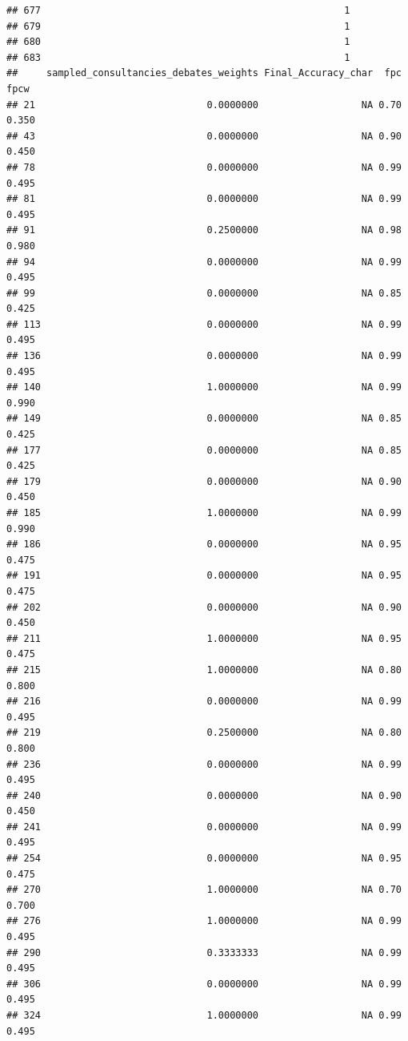 \documentclass[
]{article}
\begin{document}
\begin{verbatim}
## 677                                                     1
## 679                                                     1
## 680                                                     1
## 683                                                     1
##     sampled_consultancies_debates_weights Final_Accuracy_char  fpc  fpcw
## 21                              0.0000000                  NA 0.70 0.350
## 43                              0.0000000                  NA 0.90 0.450
## 78                              0.0000000                  NA 0.99 0.495
## 81                              0.0000000                  NA 0.99 0.495
## 91                              0.2500000                  NA 0.98 0.980
## 94                              0.0000000                  NA 0.99 0.495
## 99                              0.0000000                  NA 0.85 0.425
## 113                             0.0000000                  NA 0.99 0.495
## 136                             0.0000000                  NA 0.99 0.495
## 140                             1.0000000                  NA 0.99 0.990
## 149                             0.0000000                  NA 0.85 0.425
## 177                             0.0000000                  NA 0.85 0.425
## 179                             0.0000000                  NA 0.90 0.450
## 185                             1.0000000                  NA 0.99 0.990
## 186                             0.0000000                  NA 0.95 0.475
## 191                             0.0000000                  NA 0.95 0.475
## 202                             0.0000000                  NA 0.90 0.450
## 211                             1.0000000                  NA 0.95 0.475
## 215                             1.0000000                  NA 0.80 0.800
## 216                             0.0000000                  NA 0.99 0.495
## 219                             0.2500000                  NA 0.80 0.800
## 236                             0.0000000                  NA 0.99 0.495
## 240                             0.0000000                  NA 0.90 0.450
## 241                             0.0000000                  NA 0.99 0.495
## 254                             0.0000000                  NA 0.95 0.475
## 270                             1.0000000                  NA 0.70 0.700
## 276                             1.0000000                  NA 0.99 0.495
## 290                             0.3333333                  NA 0.99 0.495
## 306                             0.0000000                  NA 0.99 0.495
## 324                             1.0000000                  NA 0.99 0.495

\end{verbatim}
\end{document}
